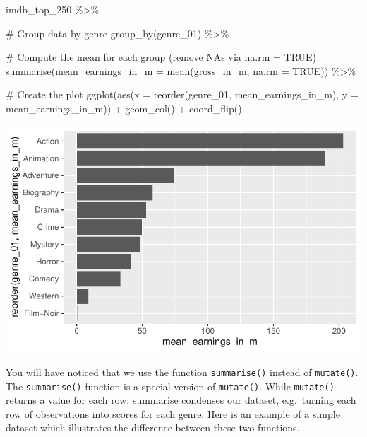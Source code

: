 \documentclass[
  letterpaper,
]{krantz}
\makeatletter
\newenvironment{Shaded}{\begin{snugshade}}{\end{snugshade}}
\newcommand{\AttributeTok}[1]{\textcolor[rgb]{0.40,0.45,0.13}{#1}}
\newcommand{\CommentTok}[1]{\textcolor[rgb]{0.37,0.37,0.37}{#1}}
\newcommand{\ConstantTok}[1]{\textcolor[rgb]{0.56,0.35,0.01}{#1}}
\newcommand{\FunctionTok}[1]{\textcolor[rgb]{0.28,0.35,0.67}{#1}}
\newcommand{\NormalTok}[1]{\textcolor[rgb]{0.00,0.23,0.31}{#1}}
\newcommand{\SpecialCharTok}[1]{\textcolor[rgb]{0.37,0.37,0.37}{#1}}
\newenvironment{kframe}{%
\medskip{}
\setlength{\fboxsep}{.8em}
 \def\at@end@of@kframe{}%
 \ifinner\ifhmode%
  \def\at@end@of@kframe{\end{minipage}}%
  \begin{minipage}{\columnwidth}%
 \fi\fi%
 \def\FrameCommand##1{\hskip\@totalleftmargin \hskip-\fboxsep
 \colorbox{shadecolor}{##1}\hskip-\fboxsep
     \hskip-\linewidth \hskip-\@totalleftmargin \hskip\columnwidth}%
 \MakeFramed {\advance\hsize-\width
   \@totalleftmargin\z@ \linewidth\hsize
   \@setminipage}}%
 {\par\unskip\endMakeFramed%
 \at@end@of@kframe}
\renewenvironment{Shaded}{\begin{kframe}}{\end{kframe}}
\makeatother
\begin{document}
\begin{Shaded}
\begin{Highlighting}[]
\NormalTok{imdb\_top\_250 }\SpecialCharTok{\%\textgreater{}\%}
  
  \CommentTok{\# Group data by genre}
  \FunctionTok{group\_by}\NormalTok{(genre\_01) }\SpecialCharTok{\%\textgreater{}\%}
  
  \CommentTok{\# Compute the mean for each group (remove NAs via na.rm = TRUE)}
  \FunctionTok{summarise}\NormalTok{(}\AttributeTok{mean\_earnings\_in\_m =} \FunctionTok{mean}\NormalTok{(gross\_in\_m, }\AttributeTok{na.rm =} \ConstantTok{TRUE}\NormalTok{)) }\SpecialCharTok{\%\textgreater{}\%}
  
  \CommentTok{\# Create the plot}
  \FunctionTok{ggplot}\NormalTok{(}\FunctionTok{aes}\NormalTok{(}\AttributeTok{x =} \FunctionTok{reorder}\NormalTok{(genre\_01, mean\_earnings\_in\_m), }\AttributeTok{y =}\NormalTok{ mean\_earnings\_in\_m)) }\SpecialCharTok{+}
  \FunctionTok{geom\_col}\NormalTok{() }\SpecialCharTok{+}
  \FunctionTok{coord\_flip}\NormalTok{()}
\end{Highlighting}
\end{Shaded}

\includegraphics{08_descriptive_statistics_files/figure-pdf/plotting-mean-movie-genre-earnings-1.pdf}

You will have noticed that we use the function \texttt{summarise()}
instead of \texttt{mutate()}. The \texttt{summarise()} function is a
special version of \texttt{mutate()}. While \texttt{mutate()} returns a
value for each row, summarise condenses our dataset, e.g.~turning each
row of observations into scores for each genre. Here is an example of a
simple dataset which illustrates the difference between these two
functions.
\end{document}
